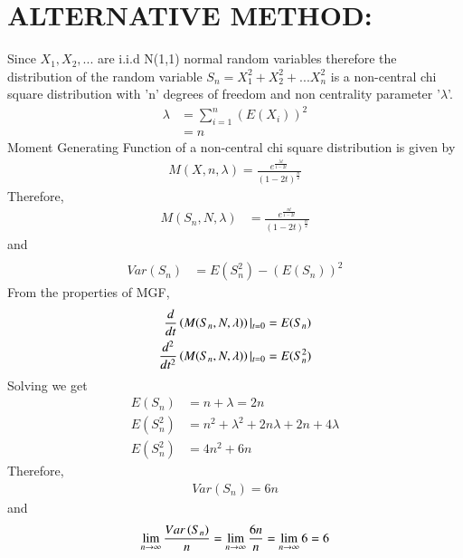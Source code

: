 \documentclass[journal,12pt,twocolumn]{IEEEtran}
\begin{document}
\section{\textbf{ALTERNATIVE METHOD:}}
Since $X_{1},X_{2},...$ are i.i.d N(1,1) normal random variables therefore the distribution of the random variable $S_{n}=X_{1}^{2}+X_{2}^{2}+...X_{n}^{2}$ is a non-central chi square distribution with 'n' degrees of freedom and non centrality parameter '$\lambda$'.
\begin{align}
    \lambda&=\sum_{i=1}^{n}(E(X_{i}))^{2}
    \\   &=n
\end{align}
Moment Generating Function of a non-central chi square distribution is given by
\begin{align}
    M(X,n,\lambda)=\frac{e^{\frac{\lambda t}{1-2t}}}{(1-2t)^{\frac{n}{2}}}
\end{align}
Therefore,
\begin{align}
    M(S_{n},N,\lambda)&=\frac{e^{\frac{n t}{1-2t}}}{(1-2t)^{\frac{n}{2}}}
\end{align}
and
\begin{align}
    \\ Var(S_{n})&=E(S_{n}^2)-(E(S_{n}))^2
\end{align}
From the properties of MGF,
\begin{align}
 \frac{d}{dt}\left(M(S_{n},N,\lambda)\right)|_{t=0}&=E(S_{n})
\\ \frac{d^{2}}{dt^{2}}\left(M(S_{n},N,\lambda)\right)|_{t=0}&=E(S_{n}^2)
\end{align}
Solving we get
\begin{align}
    E(S_{n})&=n+\lambda=2n
   \\ E(S_{n}^{2})&=n^2+\lambda^2+2n\lambda+2n+4\lambda
    \\ E(S_{n}^{2})&=4n^2+6n
\end{align}
Therefore,
\begin{align}
    Var(S_{n})=6n
\end{align}
and
$$\lim_{n \to \infty}{\frac{Var\left(S_{n}\right)}{n}}=\lim_{n \to \infty}{\frac{6n}{n}}=\lim_{n \to \infty}{6}=6$$
\end{document}
